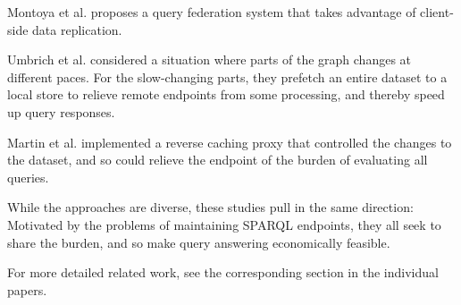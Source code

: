 Montoya et al. \cite{DBLP:journals/corr/MontoyaSMV15} proposes a query
federation system that takes advantage of client-side data
replication. 

Umbrich et al. \cite{umbrich2012hybrid} considered a situation where
parts of the graph changes at different paces. For the slow-changing
parts, they prefetch an entire dataset to a local store to relieve
remote endpoints from some processing, and thereby speed up query
responses. 

Martin et al. \cite{sparqlproxy} implemented a reverse caching proxy
that controlled the changes to the dataset, and so could relieve the
endpoint of the burden of evaluating all queries.

While the approaches are diverse, these studies pull in the same
direction: Motivated by the problems of maintaining SPARQL endpoints,
they all seek to share the burden, and so make query answering
economically feasible.

For more detailed related work, see the corresponding section in the
individual papers.
